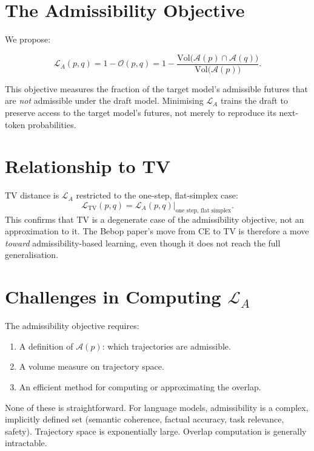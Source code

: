 \documentclass[11pt, a4paper, openany]{book}
\theoremstyle{plain}
\theoremstyle{definition}
\theoremstyle{remark}
\newcommand{\Vol}{\mathrm{Vol}}
\begin{document}
\section{The Admissibility Objective}

We propose:

\begin{equation}
  \mathcal{L}_A(p, q)
  = 1 - \mathcal{O}(p, q)
  = 1 - \frac{\Vol\!\bigl(\mathcal{A}(p) \cap \mathcal{A}(q)\bigr)}{\Vol\!\bigl(\mathcal{A}(p)\bigr)}.
  \label{eq:admissibility-objective}
\end{equation}

This objective measures the fraction of the target model's admissible
futures that are \emph{not} admissible under the draft model.
Minimising $\mathcal{L}_A$ trains the draft to preserve access to the
target model's futures, not merely to reproduce its next-token probabilities.

\section{Relationship to TV}

TV distance is $\mathcal{L}_A$ restricted to the one-step, flat-simplex case:
\[
  \mathcal{L}_{\mathrm{TV}}(p, q) = \mathcal{L}_A(p, q)\big|_{\text{one step, flat simplex}}.
\]
This confirms that TV is a degenerate case of the admissibility objective,
not an approximation to it.
The Bebop paper's move from CE to TV is therefore a move \emph{toward}
admissibility-based learning, even though it does not reach the full
generalisation.

\section{Challenges in Computing $\mathcal{L}_A$}

The admissibility objective requires:
\begin{enumerate}
  \item A definition of $\mathcal{A}(p)$: which trajectories are admissible.
  \item A volume measure on trajectory space.
  \item An efficient method for computing or approximating the overlap.
\end{enumerate}

None of these is straightforward.
For language models, admissibility is a complex, implicitly defined set
(semantic coherence, factual accuracy, task relevance, safety).
Trajectory space is exponentially large.
Overlap computation is generally intractable.
\end{document}
